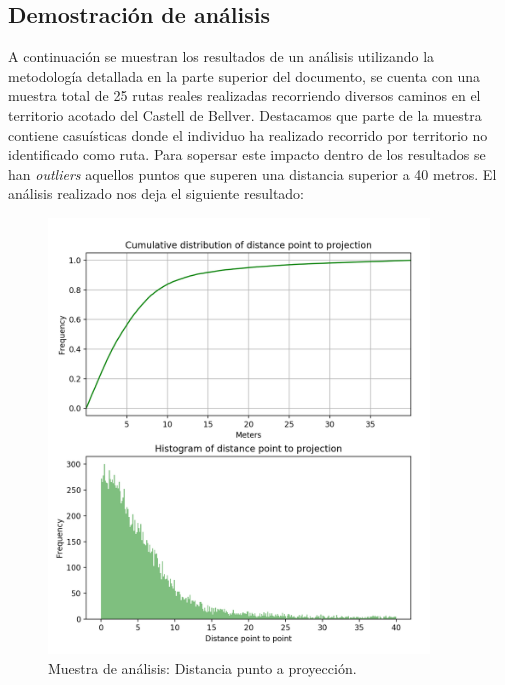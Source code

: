 \subsection{Demostración de análisis}
A continuación se muestran los resultados de un análisis utilizando la metodología detallada en 
la parte superior del documento, se cuenta con una muestra total de 25 rutas reales realizadas 
recorriendo diversos caminos en el territorio acotado del Castell de Bellver. Destacamos que parte 
de la muestra contiene casuísticas donde el individuo ha realizado recorrido por territorio no identificado como ruta. Para sopersar este impacto dentro de los resultados se han \textit{outliers} aquellos puntos 
que superen una distancia superior a 40 metros. El análisis realizado nos deja el siguiente resultado:
\begin{figure}[!htb]
\begin{minipage}{0.48\textwidth}
\centering
\includegraphics[width=0.9\textwidth]{./Imagenes/PointToProjection.png}
\caption{Muestra de análisis: Distancia punto a proyección.}
\label{figure:PointToProjection}
\end{minipage}\hfill
\begin{minipage}{0.48\textwidth}
\centering

\end{minipage}
\end{figure}

